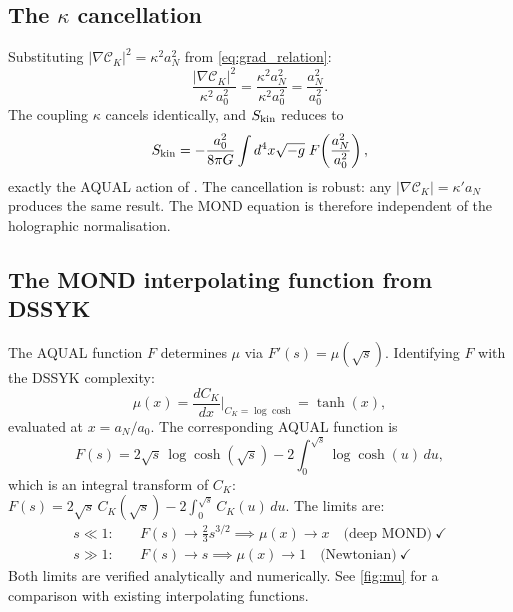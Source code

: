 \documentclass[a4paper,11pt]{article}
\newcommand{\CK}{\mathcal{C}_K}                     %
\newcommand{\kap}{\kappa}                            %
\newcommand{\az}{a_0}                                %
\newcommand{\aN}{a_N}                                %
\begin{document}
\subsection{The $\kappa$ cancellation}
\label{sec:kappa_cancel}

Substituting $|\nabla\CK|^2=\kap^2\aN^2$ from \cref{eq:grad_relation}:
\begin{equation}
  \frac{|\nabla\CK|^2}{\kap^2\,\az^2}
  = \frac{\kap^2\aN^2}{\kap^2\az^2}
  = \frac{\aN^2}{\az^2}.
  \label{eq:kappa_cancel}
\end{equation}
The coupling $\kap$ cancels identically, and $S_{\rm kin}$ reduces to
\begin{equation}
  S_{\rm kin} = -\frac{\az^2}{8\pi G}\int d^4x\sqrt{-g}\;
  F\!\left(\frac{\aN^2}{\az^2}\right),
  \label{eq:Skin_reduced}
\end{equation}
exactly the AQUAL action of \citeauthor{Bekenstein:1984}
\cite{Bekenstein:1984}.  The cancellation is robust: any
$|\nabla\CK|=\kap'\aN$ produces the same result.  The MOND equation is
therefore independent of the holographic normalisation.

\subsection{The MOND interpolating function from DSSYK}
\label{sec:mu_from_DSSYK}

The AQUAL function $F$ determines $\mu$ via $F'(s)=\mu(\sqrt{s})$.
Identifying $F$ with the DSSYK complexity:
\begin{equation}
  \mu(x) = \frac{dC_K}{dx}\bigg|_{C_K=\log\cosh} = \tanh(x),
  \label{eq:mu_tanh}
\end{equation}
evaluated at $x=\aN/\az$.  The corresponding AQUAL function is
\begin{equation}
  F(s) = 2\sqrt{s}\,\log\cosh(\sqrt{s})
       - 2\int_0^{\sqrt{s}}\log\cosh(u)\,du,
  \label{eq:F}
\end{equation}
which is an integral transform of $C_K$: $F(s)=2\sqrt{s}\,C_K(\sqrt{s})
-2\int_0^{\sqrt{s}}C_K(u)\,du$.  The limits are:
\begin{align}
  s\ll 1: &\quad F(s)\to\tfrac{2}{3}s^{3/2} \implies \mu(x)\to x
    \quad\text{(deep MOND)}\ \checkmark \label{eq:deep_MOND}\\
  s\gg 1: &\quad F(s)\to s \implies \mu(x)\to 1
    \quad\text{(Newtonian)}\ \checkmark \label{eq:Newton}
\end{align}
Both limits are verified analytically and numerically.
See \cref{fig:mu} for a comparison with existing interpolating functions.
\end{document}
